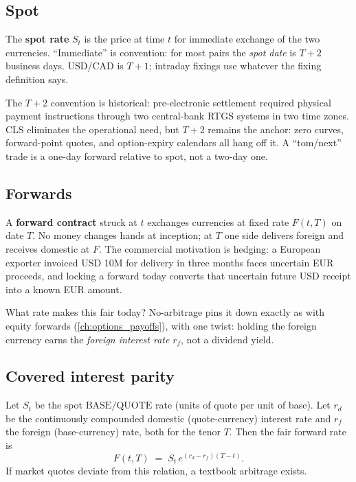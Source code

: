 \subsection{Spot}

The \textbf{spot rate} $S_t$ is the price at time $t$ for immediate
exchange of the two currencies.  ``Immediate'' is convention: for
most pairs the \emph{spot date} is $T+2$ business days.  USD/CAD is
$T+1$; intraday fixings use whatever the fixing definition says.

The $T+2$ convention is historical: pre-electronic settlement
required physical payment instructions through two central-bank
RTGS systems in two time zones.  CLS eliminates the operational
need, but $T+2$ remains the anchor: zero curves, forward-point
quotes, and option-expiry calendars all hang off it.  A ``tom/next''
trade is a one-day forward relative to spot, not a two-day one.

\subsection{Forwards}

A \textbf{forward contract} struck at $t$ exchanges currencies at
fixed rate $F(t,T)$ on date $T$.  No money changes hands at
inception; at $T$ one side delivers foreign and receives domestic at
$F$.  The commercial motivation is hedging: a European exporter
invoiced USD 10M for delivery in three months faces uncertain EUR
proceeds, and locking a forward today converts that uncertain
future USD receipt into a known EUR amount.

What rate makes this fair today?  No-arbitrage pins it down exactly
as with equity forwards (\cref{ch:options_payoffs}), with one twist:
holding the foreign currency earns the \emph{foreign interest rate}
$r_f$, not a dividend yield.

\subsection{Covered interest parity}
\label{subsec:cip}

\begin{keyfactbox}
\label{fact:cip}
Let $S_t$ be the spot $\mathrm{BASE}/\mathrm{QUOTE}$ rate (units of
quote per unit of base).  Let $r_d$ be the continuously compounded
domestic (quote-currency) interest rate and $r_f$ the foreign
(base-currency) rate, both for the tenor $T$.  Then the fair forward
rate is
\begin{equation}
  F(t,T) \;=\; S_t \, e^{(r_d - r_f)(T - t)}.
  \label{eq:cip}
\end{equation}
If market quotes deviate from this relation, a textbook arbitrage
exists.
\end{keyfactbox}

